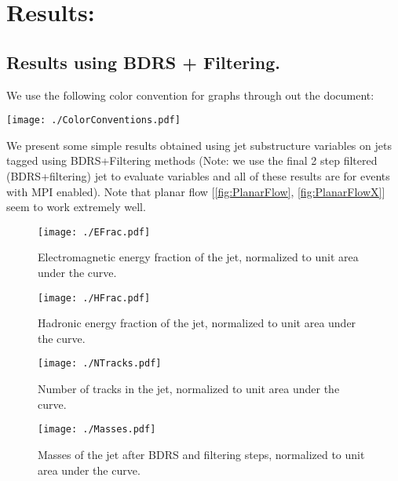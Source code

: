 \section{Results:}
\subsection{Results using BDRS + Filtering.}
We use the following color convention for graphs through out the document:
\begin{center}
    \texttt{[image: ./ColorConventions.pdf]}
\end{center}
We present some simple results obtained using jet substructure variables on jets tagged using BDRS+Filtering methods (Note: we use the final 2 step filtered (BDRS+filtering) jet to evaluate variables and all of these results are for events with MPI enabled). Note that planar flow [\autoref{fig:PlanarFlow}, \autoref{fig:PlanarFlowX}] seem to work extremely well.

\begin{figure}
    \begin{center}
        \texttt{[image: ./EFrac.pdf]}
        \caption{ Electromagnetic energy fraction of the jet, normalized to unit area under the curve. }
        \label{fig:EFrac}
    \end{center}
\end{figure}

\begin{figure}
    \begin{center}
        \texttt{[image: ./HFrac.pdf]}
        \caption{ Hadronic energy fraction of the jet, normalized to unit area under the curve. }
        \label{fig:HFrac}
    \end{center}
\end{figure}

\begin{figure}
    \begin{center}
        \texttt{[image: ./NTracks.pdf]}
        \caption{ Number of tracks in the jet, normalized to unit area under the curve. }
        \label{fig:NTracks}
    \end{center}
\end{figure}

\begin{figure}
    \begin{center}
        \texttt{[image: ./Masses.pdf]}
        \caption{ Masses of the jet after BDRS and filtering steps, normalized to unit area under the curve. }
        \label{fig:Masses}
    \end{center}
\end{figure}

